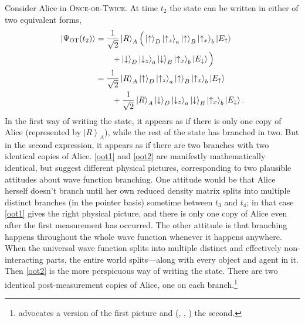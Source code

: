 \documentclass[12pt,onecolumn,secnumarabic,amsmath,amssymb,balancelastpage,nofootinbib]{article}
\newcommand{\ket}[1]{\ensuremath{\left|#1\right\rangle}}
\begin{document}
Consider Alice in \textsc{Once-or-Twice}. At time $t_2$ the state can be written in either of two equivalent forms,
\begin{align}
\ket{\Psi_{\textsc{OT}}(t_2)}&=\frac{1}{\sqrt{2}}\ket{R}_A\Big(\ket{\uparrow}_{D}\ket{\uparrow_z}_a\ket{\uparrow}_B\ket{\uparrow_x}_b\ket{E_{\uparrow}}\nonumber\\
&\qquad+\ket{\downarrow}_{D}\ket{\downarrow_z}_a\ket{\downarrow}_B\ket{\uparrow_x}_b\ket{E_{\downarrow}}\Big)
\label{oot1}
\\
&=\frac{1}{\sqrt{2}}\ket{R}_A\ket{\uparrow}_{D}\ket{\uparrow_z}_a\ket{\uparrow}_B\ket{\uparrow_x}_b\ket{E_{\uparrow}}\nonumber\\
&\qquad+\frac{1}{\sqrt{2}}\ket{R}_A\ket{\downarrow}_{D}\ket{\downarrow_z}_a\ket{\downarrow}_B\ket{\uparrow_x}_b\ket{E_{\downarrow}}.
\label{oot2}
\end{align}
In the first way of writing the state, it appears as if there is only one copy of Alice (represented by $\ket{R}_A$), while the rest of the state has branched in two. But in the second expression, it appears as if there are two branches with two identical copies of Alice. \eqref{oot1} and \eqref{oot2} are manifestly mathematically identical, but suggest different physical pictures, corresponding to two plausible attitudes about wave function branching. One attitude would be that Alice herself doesn't branch until her own reduced density matrix splits into multiple distinct branches (in the pointer basis) sometime between $t_3$ and $t_4$; in that case \eqref{oot1} gives the right physical picture, and there is only one copy of Alice even after the first measurement has occurred. The other attitude is that branching happens throughout the whole wave function whenever it happens anywhere.  When the universal wave function splits into multiple distinct and effectively non-interacting parts, the entire world splits---along with every object and agent in it. Then \eqref{oot2} is the more perspicuous way of writing the state.  There are two identical post-measurement copies of Alice, one on each branch.\footnote{\citet[]{wallace2012} advocates a version of the first picture and \citeauthor{vaidman2014} (\citeyear{vaidman2014}, \citeyear{vaidmanSEP}, \citeyear{vaidman2015}) the second.}
\end{document}
